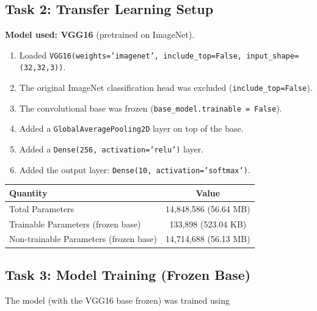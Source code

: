 \documentclass[11pt]{article}
\begin{document}

\subsection*{Task 2: Transfer Learning Setup}

\textbf{Model used: VGG16} (pretrained on ImageNet).

\begin{enumerate}

\item Loaded \texttt{VGG16(weights='imagenet', include\_top=False, input\_shape=(32,32,3))}.

\item The original ImageNet classification head was excluded (\texttt{include\_top=False}).

\item The convolutional base was frozen (\texttt{base\_model.trainable = False}).

\item Added a \texttt{GlobalAveragePooling2D} layer on top of the base.

\item Added a \texttt{Dense(256, activation='relu')} layer.

\item Added the output layer: \texttt{Dense(10, activation='softmax')}.

\end{enumerate}

\begin{center}
\begin{tabular}{|l|c|}
\hline
Quantity & Value\\
\hline
Total Parameters & 14,848,586 (56.64 MB)\\
Trainable Parameters (frozen base) & 133,898 (523.04 KB)\\
Non-trainable Parameters (frozen base) & 14,714,688 (56.13 MB)\\
\hline
\end{tabular}
\end{center}


\subsection*{Task 3: Model Training (Frozen Base)}

The model (with the VGG16 base frozen) was trained using
\end{document}
